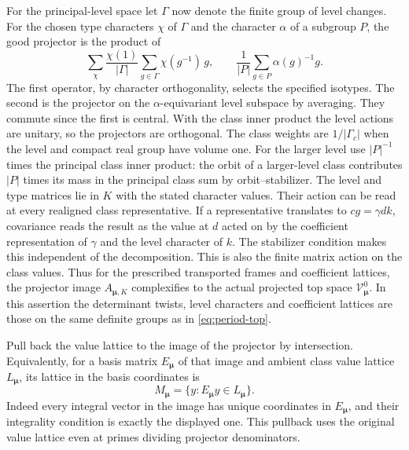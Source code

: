 For the principal-level space let \(\Gamma\) now denote the finite
group of level changes. For the chosen type characters \(\chi\) of
\(\Gamma\) and the character \(\alpha\) of a subgroup \(P\), the good
projector is the product of
\[
 \sum_{\chi}\frac{\chi(1)}{|\Gamma|}
                  \sum_{g\in\Gamma}\chi(g^{-1})\,g,
 \qquad
 \frac1{|P|}\sum_{g\in P}\alpha(g)^{-1}g .
\]
The first operator, by character orthogonality, selects the specified
isotypes. The second is the projector on the \(\alpha\)-equivariant
level subspace by averaging. They commute since the first is central.
With the class inner product the level actions are unitary, so the
projectors are orthogonal. The class weights are \(1/|\Gamma_c|\)
when the level and compact real group have volume one. For the
larger level use \(|P|^{-1}\) times the principal class inner product:
the orbit of a larger-level class contributes \(|P|\) times its
mass in the principal class sum by orbit--stabilizer.
The level and type matrices lie in \(K\) with the stated character
values. Their action can be read at every realigned class
representative. If a representative translates to \(cg=\gamma d k\),
covariance reads the result as the value at \(d\) acted on by the
coefficient representation of \(\gamma\) and the level character of
\(k\). The stabilizer condition makes this independent of the
decomposition. This is also the finite matrix action on the class
values. Thus for the prescribed transported frames and coefficient
lattices, the projector image \(A_{\boldsymbol\mu,K}\) complexifies
to the actual projected top space \(\mathcal V^0_{\boldsymbol\mu}\).
In this assertion the determinant twists, level characters and
coefficient lattices are those on the same definite groups as in
\eqref{eq:period-top}.

Pull back the value lattice to the image of the projector by
intersection. Equivalently, for a basis matrix \(E_{\boldsymbol\mu}\)
of that image and ambient class value lattice \(L_{\boldsymbol\mu}\),
its lattice in the basis coordinates is
\[
 M_{\boldsymbol\mu}=
     \{y:E_{\boldsymbol\mu}y\in L_{\boldsymbol\mu}\}.
\]
Indeed every integral vector in the image has unique coordinates
in \(E_{\boldsymbol\mu}\), and their integrality condition is
exactly the displayed one. This pullback uses the original value
lattice even at primes dividing projector denominators.

